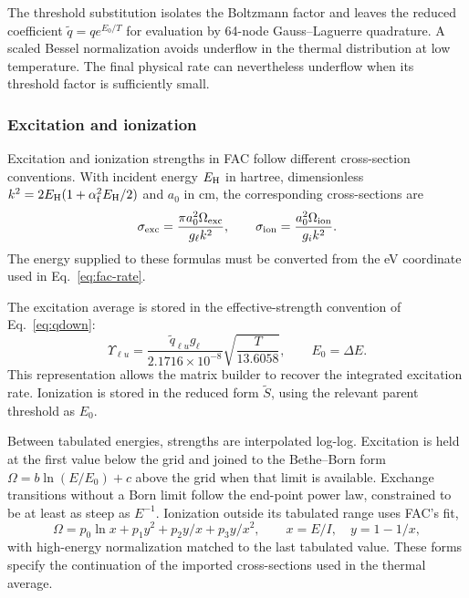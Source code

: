 \documentclass[11pt,a4paper]{article}
\numberwithin{equation}{section}
\begin{document}
The threshold substitution isolates the Boltzmann factor and leaves
the reduced coefficient $\widetilde q=q e^{E_0/T}$ for evaluation
by 64-node Gauss--Laguerre quadrature. A scaled Bessel normalization
avoids underflow in the thermal distribution at low temperature.
The final physical rate can nevertheless underflow when its threshold
factor is sufficiently small.

\subsubsection{Excitation and ionization}

Excitation and ionization strengths in FAC follow different
cross-section conventions. With incident energy $E_{\rm H}$ in
hartree, dimensionless
$k^2=2E_{\rm H}(1+\alpha_{\rm f}^2E_{\rm H}/2)$ and $a_0$ in cm,
the corresponding cross-sections are
\begin{equation}
 \sigma_{\rm exc}=\frac{\pi a_0^2\Omega_{\rm exc}}{g_\ell k^2},
 \qquad
 \sigma_{\rm ion}=\frac{a_0^2\Omega_{\rm ion}}{g_i k^2}.
\end{equation}
The energy supplied to these formulas must be converted from the eV
coordinate used in Eq.~\eqref{eq:fac-rate}.

The excitation average is stored in the effective-strength convention
of Eq.~\eqref{eq:qdown}:
\begin{equation}
 \Upsilon_{\ell u}
  =\frac{\widetilde q_{\ell u}g_\ell}{2.1716\times10^{-8}}
    \sqrt{\frac{T}{13.6058}},\qquad E_0=\Delta E.
\end{equation}
This representation allows the matrix builder to recover the
integrated excitation rate. Ionization is stored in the reduced
form $\widetilde S$, using the relevant parent threshold as $E_0$.

Between tabulated energies, strengths are interpolated log-log.
Excitation is held at the first value below the grid and joined to
the Bethe--Born form $\Omega=b\ln(E/E_0)+c$ above the grid when
that limit is available. Exchange transitions without a Born limit
follow the end-point power law, constrained to be at least as steep
as $E^{-1}$. Ionization outside its tabulated range uses FAC's fit,
\begin{equation}
 \Omega=p_0\ln x+p_1y^2+p_2y/x+p_3y/x^2,
 \qquad x=E/I,\quad y=1-1/x,
\end{equation}
with high-energy normalization matched to the last tabulated value.
These forms specify the continuation of the imported cross-sections
used in the thermal average.
\end{document}

